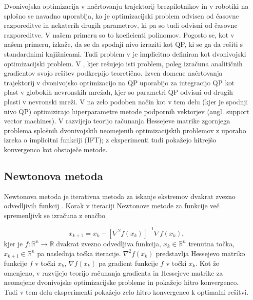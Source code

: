 \documentclass[isrm2, tisk]{fmfdelo}
\begin{document}
Dvonivojska optimizacija v načrtovanju trajektorij brezpilotnikov in v robotiki na splošno se navadno uporablja, ko je optimizacijski problem odvisen od časovne razporeditve in nekaterih drugih parametrov, ki pa so tudi odvisni od časovne razporeditve. V našem primeru so to koeficienti polinomov. Pogosto se, kot v našem primeru, izkaže, da se da spodnji nivo izraziti kot \ac{QP}, ki se ga da rešiti s standardnimi knjižnicami. Tudi problem v \cite{mellinger2011minimum} je implicitno definiran kot dvonivojski optimizacijski problem. V \cite{sun2021fast}, kjer rešujejo isti problem, poleg izračuna analitičnih gradientov svojo rešitev podkrepijo teoretično. Izven domene načrtovanja trajektorij v \cite{amos2017optnet} dvonivojsko optimizacijo na \ac{QP} uporabijo za integracijo \ac{QP} kot plast v globokih nevronskih mrežah, kjer so parametri \ac{QP} odvisni od drugih plasti v nevronski mreži. V \cite{chapelle2002choosing} na zelo podoben način kot v tem delu (kjer je spodnji nivo \ac{QP}) optimizirajo hiperparametre metode podpornih vektorjev (angl. support vector machines). V \cite{dyro2022second} razvijejo teorijo računanja Hessejeve matrike zgornjega problema splošnih dvonivojskih neomejenih optimizacijskih problemov z uporabo izreka o implicitni funkciji (\acs{IFT}); z eksperimenti tudi pokažejo hitrejšo konvergenco kot obstoječe metode.

\subsection{Newtonova metoda}
Newtonova metoda je iterativna metoda za iskanje ekstremov dvakrat zvezno odvedljivih funkcij \cite{boyd2004convex}. Korak v iteraciji Newtonove metode za funkcije več spremenljivk se izračuna z enačbo

\begin{equation}
    x_{k+1} = x_k - [\nabla^2 f(x_k)]^{-1} \nabla f(x_k), 
\end{equation}
kjer je $f : \mathbb{R}^n \to \mathbb{R}$ dvakrat zvezno odvedljiva funkcija, $x_k \in \mathbb{R}^n$ trenutna točka, $x_{k+1} \in \mathbb{R}^n$ pa naslednja točka iteracije. $\nabla^2f(x_k)$ predstavlja Hessejevo matriko funkcije $f$ v točki $x_k$, $\nabla f(x_k)$ pa gradient funkcije $f$ v točki $x_k$. Kot že omenjeno, v \cite{dyro2022second} razvijejo teorijo računanja gradienta in Hessejeve matrike za neomejene dvonivojske optimizacijske probleme in pokažejo hitro konvergenco. Tudi v tem delu eksperimenti pokažejo zelo hitro konvergenco k optimalni rešitvi.
\end{document}
